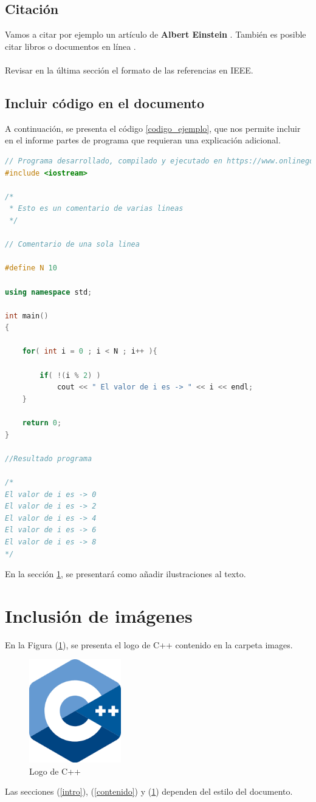\documentclass{article}
\begin{document}
\subsection{Citación}
Vamos a citar por ejemplo un artículo de \textbf{Albert Einstein} \cite{einstein}.
También es posible citar libros \cite{dirac} o documentos en línea \cite{knuthwebsite}.\\\\
Revisar en la última sección el formato de las referencias en IEEE.

\subsection{Incluir código en el documento}
%
A continuación, se presenta el código \ref{codigo_ejemplo}, que nos permite incluir en el informe partes de programa que requieran una explicación adicional.
\begin{lstlisting}[language=C++, label=codigo_ejemplo]
// Programa desarrollado, compilado y ejecutado en https://www.onlinegdb.com
#include <iostream>

/*
 * Esto es un comentario de varias lineas
 */

// Comentario de una sola linea

#define N 10

using namespace std;

int main()
{
    
    for( int i = 0 ; i < N ; i++ ){
        
        if( !(i % 2) )
            cout << " El valor de i es -> " << i << endl;
    }
    
    return 0;
}

//Resultado programa

/*
El valor de i es -> 0
El valor de i es -> 2
El valor de i es -> 4
El valor de i es -> 6
El valor de i es -> 8
*/
\end{lstlisting}
En la sección \ref{imagenes}, se presentará como añadir ilustraciones al texto.

\section{Inclusión de imágenes} \label{imagenes}

En la Figura (\ref{fig:cpplogo}), se presenta el logo de C++ contenido en la carpeta images.

\begin{figure}[h]
\includegraphics[width=4cm]{cpplogo.png}
\centering
\caption{Logo de C++}
\label{fig:cpplogo}
\end{figure}

Las secciones (\ref{intro}), (\ref{contenido}) y (\ref{imagenes}) dependen del estilo del documento.



\end{document}

